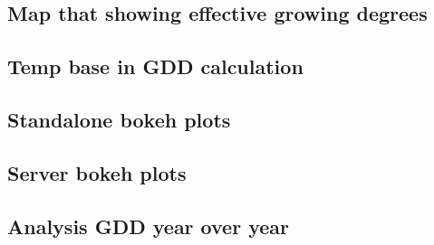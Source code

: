 \documentclass[11pt,letterpaper]{article}
\begin{document}
\subsection{Map that showing effective growing degrees}
\subsection{Temp base in GDD calculation}
\subsection{Standalone bokeh plots}
\subsection{Server bokeh plots}
\subsection{Analysis GDD year over year}
\end{document}
